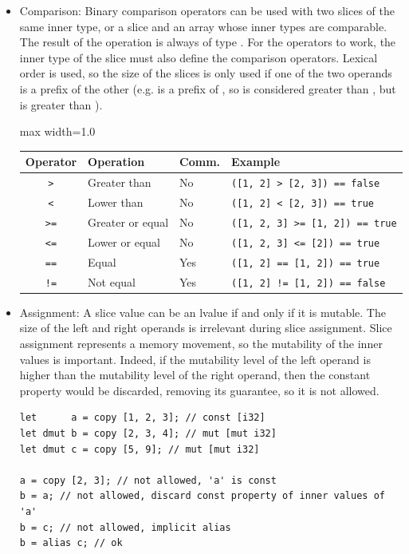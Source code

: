 \begin{itemize}
\item Comparison: Binary comparison operators can be used with two slices of the
  same inner type, or a slice and an array whose inner types are comparable. The
  result of the operation is always of type . For the operators to
  work, the inner type of the slice must also define the comparison operators.
  Lexical order is used, so the size of the slices is only used if one of the
  two operands is a prefix of the other (e.g. \token{[1, 2]} is a prefix of
  \token{[1, 2, 3]}, so \token{[1, 2, 3]} is considered greater than
  \token{[1, 2]}, but \token{[1, 3]} is greater than \token{[1, 2, 3]}).

  \begin{center}\begin{adjustbox}{max width=1.0\linewidth}
    \begin{tabular}{|c|lll|}
      \hline
      Operator & Operation & Comm. & Example\\
      \hline
      \hline
      \texttt{>}      & Greater than     & No          & \texttt{([1, 2] > [2, 3]) == false}    \\
      \texttt{<}      & Lower than       & No          & \texttt{([1, 2] < [2, 3]) == true}     \\
      \texttt{>=}     & Greater or equal & No          & \texttt{([1, 2, 3] >= [1, 2]) == true} \\
      \texttt{<=}     & Lower or equal   & No          & \texttt{([1, 2, 3] <= [2]) == true}    \\
      \texttt{==}     & Equal            & Yes         & \texttt{([1, 2] == [1, 2]) == true}    \\
      \texttt{!=}     & Not equal        & Yes         & \texttt{([1, 2] != [1, 2]) == false}   \\
      \hline
    \end{tabular}
  \end{adjustbox}\end{center}

\item Assignment: A slice value can be an lvalue if and only if it is mutable.
  The size of the left and right operands is irrelevant during slice
  assignment. Slice assignment represents a memory movement, so the mutability
  of the inner values is important. Indeed, if the mutability level of the left
  operand is higher than the mutability level of the right operand, then the
  constant property would be discarded, removing its guarantee, so it is not
  allowed.

  \begin{lstlisting}[style=coloredverbatimError]
let      a = copy [1, 2, 3]; // const [i32]
let dmut b = copy [2, 3, 4]; // mut [mut i32]
let dmut c = copy [5, 9]; // mut [mut i32]

a = copy [2, 3]; // not allowed, 'a' is const
b = a; // not allowed, discard const property of inner values of 'a'
b = c; // not allowed, implicit alias
b = alias c; // ok
  \end{lstlisting}

\end{itemize}


